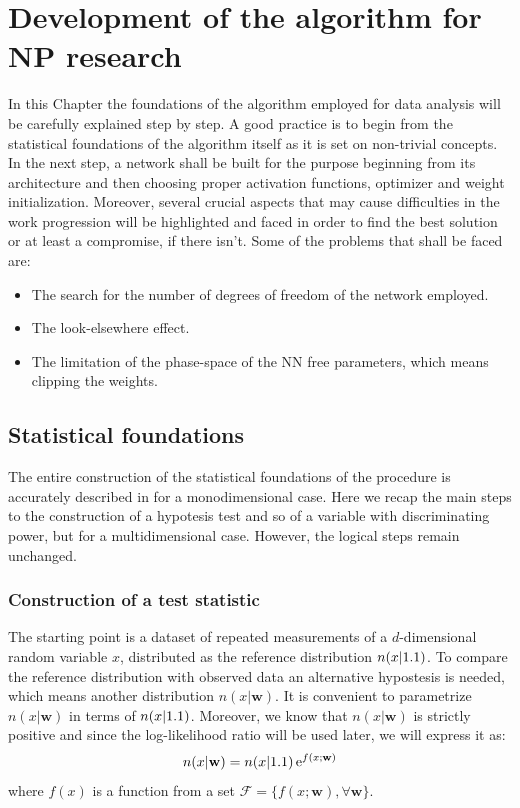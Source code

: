 \chapter{Development of the algorithm for NP research}
\label{chap:Z_5D}





In this Chapter the foundations of the algorithm employed for data analysis will be carefully explained step by step. A good practice is to begin from the statistical foundations of the algorithm itself as it is set on non-trivial concepts. In the next step, a network shall be built for the purpose beginning from its architecture and then choosing proper activation functions, optimizer and weight initialization. Moreover, several crucial aspects that may cause difficulties in the work progression will be highlighted and faced in order to find the best solution or at least a compromise, if there isn't. Some of the problems that shall be faced are:
\begin{itemize}
	\item The search for the number of degrees of freedom of the network employed.
	\item The look-elsewhere effect.
	\item The limitation of the phase-space of the NN free parameters, which means clipping the weights.
\end{itemize}





\section{Statistical foundations}
The entire construction of the statistical foundations of the procedure is accurately described in \cite{wulzer} for a monodimensional case. Here we recap the main steps to the construction of a hypotesis test and so of a variable with discriminating power, but for a multidimensional case. However, the logical steps remain unchanged.



\subsection{Construction of a test statistic}
The starting point is a dataset of repeated measurements of a $d$-dimensional random variable $x$, distributed as the reference distribution $n(x|1.1)$. To compare the reference distribution with observed data an alternative hypostesis is needed, which means another distribution $n(x|\mathbf{w})$. It is convenient to parametrize $n(x|\mathbf{w})$ in terms of $n(x|1.1)$. Moreover, we know that $n(x|\mathbf{w})$ is strictly positive and since the log-likelihood ratio will be used later, we will express it as:
\begin{equation}
	n(x|\mathbf{w}) = n(x|1.1) \operatorname{e}^{f(x;\mathbf{w})}
\end{equation}
where $f(x)$ is a function from a set $\mathcal{F} = \{ f(x;\mathbf{w}), \forall \mathbf{w} \}$.

